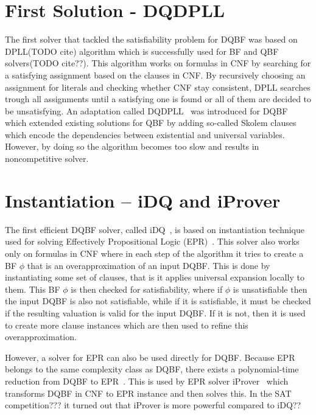 \documentclass[
  digital, %
  twoside, %
  table,   %
  nolof,     %
  nolot,     %
]{fithesis3}
\theoremstyle{definition}
\theoremstyle{remark}
\begin{document}


\section{First Solution - DQDPLL}
The first solver that tackled the satisfiability problem for DQBF was based on DPLL(TODO cite) algorithm which is successfully used for BF and QBF solvers(TODO cite??). This algorithm works on formulas in CNF by searching for a satisfying assignment based on the clauses in CNF. By recursively choosing an assignment for literals and checking whether CNF stay consistent, DPLL searches trough all assignments until a satisfying one is found or all of them are decided to be unsatisfying. An adaptation called DQDPLL~\cite{DPLLalgorithm} was introduced for DQBF which extended existing solutions for QBF by adding so-called Skolem clauses which encode the dependencies between existential and universal variables. However, by doing so the algorithm becomes too slow and results in noncompetitive solver.

\section{Instantiation -- iDQ and iProver}
The first efficient DQBF solver, called iDQ~\cite{iDQandDQDIMACS}, is based on instantiation technique used for solving Effectively Propositional Logic (EPR)~\cite{iProver}. This solver also works only on formulas in CNF where in each step of the algorithm it tries to create a BF $\phi$ that is an overapproximation of an input DQBF. This is done by instantiating some set of clauses, that is it applies universal expansion locally to them. This BF $\phi$ is then checked for satisfiability, where if $\phi$ is unsatisfiable then the input DQBF is also not satisfiable, while if it is satisfiable, it must be checked if the resulting valuation is valid for the input DQBF. If it is not, then it is used to create more clause instances which are then used to refine this overapproximation.

However, a solver for EPR can also be used directly for DQBF. Because EPR belongs to the same complexity class as DQBF, there exists a polynomial-time reduction from DQBF to EPR~\cite{iDQandDQDIMACS}. This is used by EPR solver iProver~\cite{iProver} which transforms DQBF in CNF to EPR instance and then solves this. In the SAT competition??? it turned out that iProver is more powerful compared to iDQ??
\end{document}
